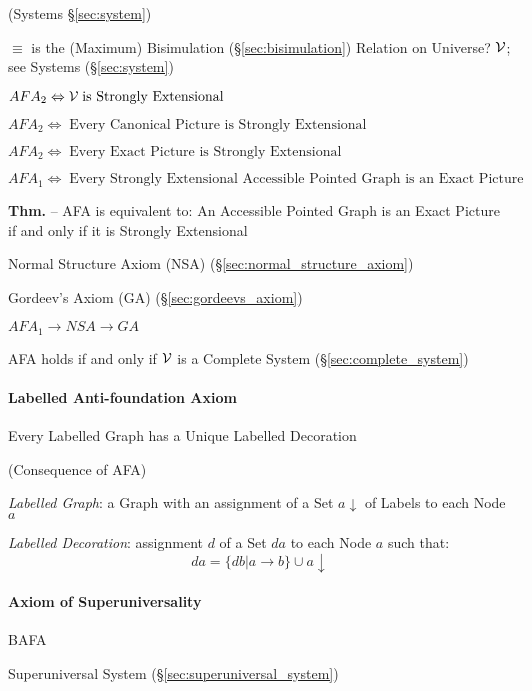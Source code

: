 (Systems \S\ref{sec:system})

$\equiv$ is the (Maximum) Bisimulation (\S\ref{sec:bisimulation}) Relation on
Universe? $\mathcal{V}$; see Systems (\S\ref{sec:system})

$AFA_2 \Leftrightarrow \mathcal{V} \;\text{is Strongly Extensional}$

$AFA_2 \Leftrightarrow \;\text{Every Canonical Picture is Strongly
  Extensional}$

$AFA_2 \Leftrightarrow \;\text{Every Exact Picture is Strongly
  Extensional}$

$AFA_1 \Leftrightarrow \;\text{Every Strongly Extensional Accessible
  Pointed Graph is an Exact Picture}$

\textbf{Thm.} -- AFA is equivalent to: An Accessible Pointed Graph is
an Exact Picture if and only if it is Strongly Extensional

Normal Structure Axiom (NSA) (\S\ref{sec:normal_structure_axiom})

Gordeev's Axiom (GA) (\S\ref{sec:gordeevs_axiom})

$AFA_1 \to NSA \to GA$

AFA holds if and only if $\mathcal{V}$ is a Complete System
(\S\ref{sec:complete_system})



\paragraph{Labelled Anti-foundation Axiom}
\label{sec:labelled_antifoundation}\hfill

\cite{aczel88}

Every Labelled Graph has a Unique Labelled Decoration

(Consequence of AFA)

\emph{Labelled Graph}: a Graph with an assignment of a Set
$a\downarrow$ of Labels to each Node $a$

\emph{Labelled Decoration}: assignment $d$ of a Set $d a$ to each Node
$a$ such that:
\[
  da = \{db | a \to b\} \cup a \downarrow
\]



\paragraph{Axiom of Superuniversality}
\label{sec:superuniversality_axiom}\hfill

BAFA

Superuniversal System (\S\ref{sec:superuniversal_system})

